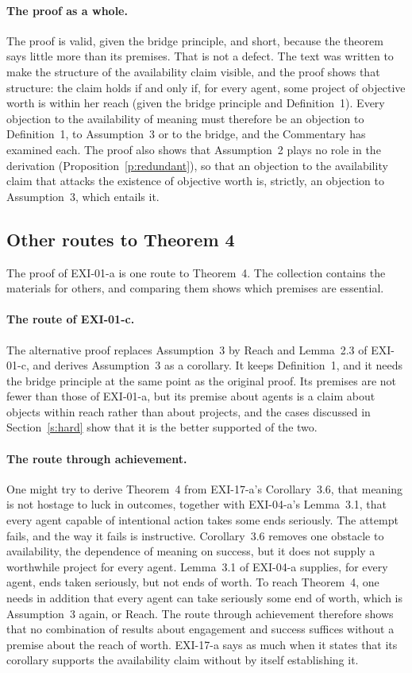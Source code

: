 \paragraph{The proof as a whole.} The proof is valid, given the bridge principle, and short, because the theorem says little more than its premises. That is not a defect. The text was written to make the structure of the availability claim visible, and the proof shows that structure: the claim holds if and only if, for every agent, some project of objective worth is within her reach (given the bridge principle and Definition~1). Every objection to the availability of meaning must therefore be an objection to Definition~1, to Assumption~3 or to the bridge, and the Commentary has examined each. The proof also shows that Assumption~2 plays no role in the derivation (Proposition~\ref{p:redundant}), so that an objection to the availability claim that attacks the existence of objective worth is, strictly, an objection to Assumption~3, which entails it.

\subsection{Other routes to Theorem 4}\label{s:routes}

The proof of EXI-01-a is one route to Theorem~4. The collection contains the materials for others, and comparing them shows which premises are essential.

\paragraph{The route of EXI-01-c.} The alternative proof replaces Assumption~3 by Reach and Lemma~2.3 of EXI-01-c, and derives Assumption~3 as a corollary. It keeps Definition~1, and it needs the bridge principle at the same point as the original proof. Its premises are not fewer than those of EXI-01-a, but its premise about agents is a claim about objects within reach rather than about projects, and the cases discussed in Section~\ref{s:hard} show that it is the better supported of the two.

\paragraph{The route through achievement.} One might try to derive Theorem~4 from EXI-17-a's Corollary~3.6, that meaning is not hostage to luck in outcomes, together with EXI-04-a's Lemma~3.1, that every agent capable of intentional action takes some ends seriously. The attempt fails, and the way it fails is instructive. Corollary~3.6 removes one obstacle to availability, the dependence of meaning on success, but it does not supply a worthwhile project for every agent. Lemma~3.1 of EXI-04-a supplies, for every agent, ends taken seriously, but not ends of worth. To reach Theorem~4, one needs in addition that every agent can take seriously some end of worth, which is Assumption~3 again, or Reach. The route through achievement therefore shows that no combination of results about engagement and success suffices without a premise about the reach of worth. EXI-17-a says as much when it states that its corollary supports the availability claim without by itself establishing it.


